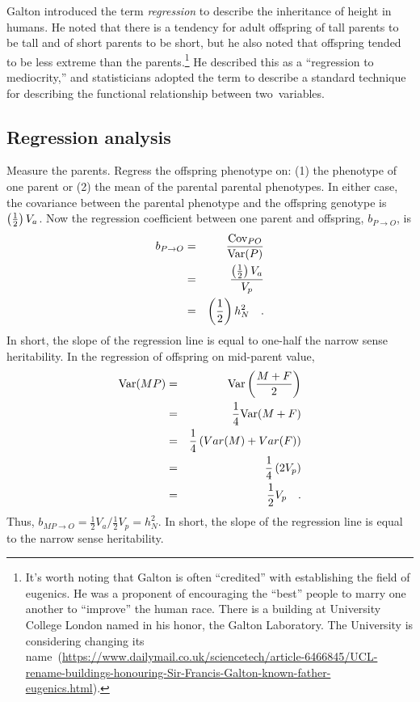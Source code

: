 Galton introduced the term {\it regression\/} to describe the
inheritance of height in humans. He noted that there is a tendency for
adult offspring of tall parents to be tall and of short parents to be
short, but he also noted that offspring tended to be less extreme than
the parents.\footnote{It's worth noting that Galton is often
  ``credited'' with establishing the field of eugenics. He was a
  proponent of encouraging the ``best'' people to marry one another to
  ``improve'' the human race. There is a building at University
  College London named in his honor, the Galton Laboratory. The
  University is considering changing its
  name~(\url{https://www.dailymail.co.uk/sciencetech/article-6466845/UCL-rename-buildings-honouring-Sir-Francis-Galton-known-father-eugenics.html}).}
He described this as a ``regression to mediocrity,'' and statisticians
adopted the term to describe a standard technique for describing the
functional relationship between two~variables.

\subsection*{Regression analysis}

Measure the parents.  Regress the offspring phenotype on: (1) the
phenotype of one parent or (2) the mean of the parental parental
phenotypes.  In either case, the covariance between the parental
phenotype and the offspring genotype is $\left({1 \over 2}\right)V_a$.
Now the regression coefficient between one parent and offspring, $b_{P
\rightarrow O}$, is
\begin{eqnarray*}
b_{P \rightarrow O}
&=& \frac{\mbox{Cov}_{PO}}{\mbox{Var}(P)} \\
&=& {\left({1 \over 2}\right)V_a \over V_p} \\
&=& \left({1 \over 2}\right)h^2_N \quad .
\end{eqnarray*}
In short, the slope of the regression line is equal to one-half the
narrow sense heritability.  In the regression of offspring on
mid-parent value,
\begin{eqnarray*}
\mbox{Var}(MP) &=& \mbox{Var}\left(\frac{M+F}{2}\right) \\
                  &=& \frac{1}{4} \mbox{Var}(M+F) \\
                  &=& \frac{1}{4} \left(Var(M) + Var(F)\right) \\
                  &=& \frac{1}{4} \left(2V_p\right) \\
                  &=& \frac{1}{2} V_p \quad .
\end{eqnarray*}
Thus, $b_{MP \rightarrow O} = \frac{1}{2}V_a/\frac{1}{2}V_p = h^2_N$.
In short, the slope of the regression line is equal to the narrow
sense heritability.

